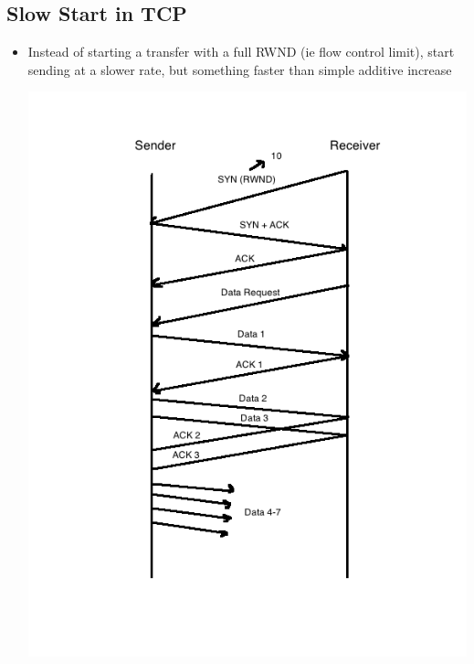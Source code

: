 \documentclass[11pt]{article}
\begin{document}
\subsection{Slow Start in TCP}
\label{sec:orgheadline140}
\begin{itemize}
\item Instead of starting a transfer with a full RWND (ie flow control
limit), start sending at a slower rate, but something faster than
simple additive increase

\includegraphics[width=.9\linewidth]{diagrams/SS.png}
\end{itemize}
\end{document}
